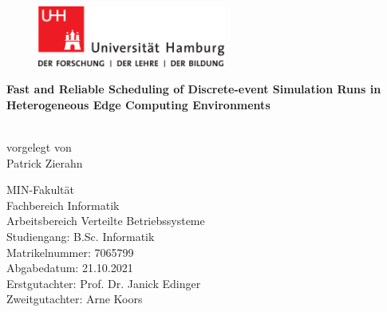 \begin{titlepage}
  \setcounter{page}{-1}
    \renewcommand{\familydefault}{\sfdefault}
\frontmatter
{}
	\begin{figure}[h]
		\begin{minipage}[b]{62mm}
			\includegraphics[width=62mm]{images/unilogo.png}
		\end{minipage}
		\hspace{4cm}
	\end{figure}

	\vfill
	\Large
	
\begin{center}
{
	{\color{uhhred}\LARGE\textbf{}}
	\vspace*{1.5cm}
	
	{\LARGE \textbf{Fast and Reliable Scheduling of Discrete-event Simulation Runs in Heterogeneous Edge Computing Environments}}}
	\vspace*{1.75cm}\\
	vorgelegt von
	\vspace*{0.4cm}\\
	\LARGE Patrick Zierahn
\end{center}
\vspace*{3.7cm}

\noindent
MIN-Fakultät \vspace*{0.2cm} \\
Fachbereich Informatik \vspace*{0.2cm} \\
Arbeitsbereich Verteilte Betriebssysteme \vspace*{0.2cm} \\
Studiengang: B.Sc. Informatik \vspace*{0.2cm} \\ 
Matrikelnummer: 7065799 \vspace*{0.5cm} \\
Abgabedatum: 21.10.2021 \vspace*{0.2cm} \\ 
Erstgutachter: Prof. Dr. Janick Edinger \vspace*{0.2cm} \\
Zweitgutachter: Arne Koors
\end{titlepage}


